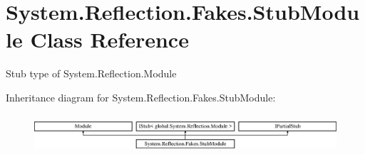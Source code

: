 \hypertarget{class_system_1_1_reflection_1_1_fakes_1_1_stub_module}{\section{System.\-Reflection.\-Fakes.\-Stub\-Module Class Reference}
\label{class_system_1_1_reflection_1_1_fakes_1_1_stub_module}
}


Stub type of System.\-Reflection.\-Module 


Inheritance diagram for System.\-Reflection.\-Fakes.\-Stub\-Module\-:\begin{figure}[H]
\begin{center}
\leavevmode
\includegraphics[height=1.458333cm]{class_system_1_1_reflection_1_1_fakes_1_1_stub_module}
\end{center}
\end{figure}
